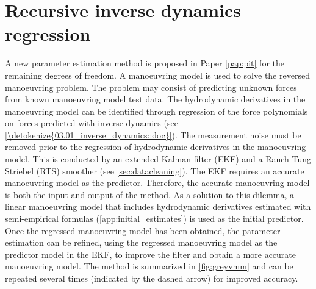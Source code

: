 \section{Recursive inverse dynamics regression} \label{sec:_VMM}
A new parameter estimation method is proposed in Paper \ref{pap:pit} for the remaining degrees of freedom. A manoeuvring model is used to solve the reversed manoeuvring problem. The problem may consist of predicting unknown forces from known manoeuvring model test data. The hydrodynamic derivatives in the manoeuvring model can be identified through regression of the force polynomials on forces predicted with inverse dynamics (see \autoref{\detokenize{03.01_inverse_dynamics::doc}}).
The measurement noise must be removed prior to the regression of hydrodynamic derivatives in the manoeuvring model. This is conducted by an extended Kalman filter (EKF) and a Rauch Tung Striebel (RTS) smoother (see \autoref{sec:datacleaning}). The EKF requires an accurate manoeuvring model as the predictor.
Therefore, the accurate manoeuvring model is both the input and output of the method. As a solution to this dilemma, a linear manoeuvring model that includes hydrodynamic derivatives estimated with semi-empirical formulas (\autoref{app:initial_estimates}) is used as the initial predictor. Once the regressed manoeuvring model has been obtained, the parameter estimation can be refined, using the regressed manoeuvring model as the predictor model in the EKF, to improve the filter and obtain a more accurate manoeuvring model. The method is summarized in \autoref{fig:greyvmm} and can be repeated several times (indicated by the dashed arrow) for improved accuracy. 
